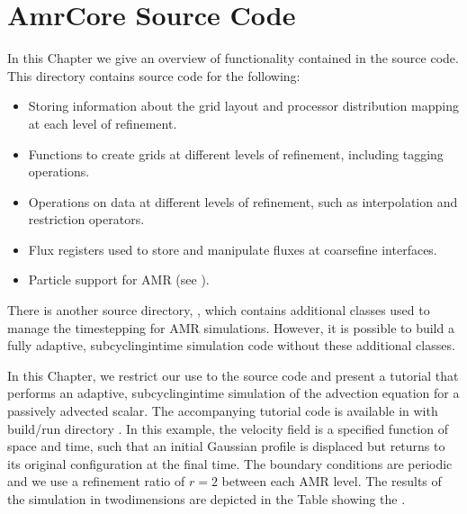 \documentclass[letterpaper,10pt,english]{sphinxmanual}
\begin{document}
\chapter{AmrCore Source Code}
\label{\detokenize{AmrCore_Chapter:amrcore-source-code}}\label{\detokenize{AmrCore_Chapter:chap-amrcore}}\label{\detokenize{AmrCore_Chapter::doc}}
\sphinxAtStartPar
In this Chapter we give an overview of functionality contained in the
 source code.  This directory contains source code for the
following:
\begin{itemize}
\item {} 
\sphinxAtStartPar
Storing information about the grid layout and processor distribution mapping
at each level of refinement.

\item {} 
\sphinxAtStartPar
Functions to create grids at different levels of refinement, including
tagging operations.

\item {} 
\sphinxAtStartPar
Operations on data at different levels of refinement, such as interpolation
and restriction operators.

\item {} 
\sphinxAtStartPar
Flux registers used to store and manipulate fluxes at coarse\sphinxhyphen{}fine
interfaces.

\item {} 
\sphinxAtStartPar
Particle support for AMR (see {\hyperref[\detokenize{Particle_Chapter:chap-particles}]{}}).

\end{itemize}

\sphinxAtStartPar
There is another source directory, , which contains
additional classes used to manage the time\sphinxhyphen{}stepping for AMR simulations.
However, it is possible to build a fully adaptive, subcycling\sphinxhyphen{}in\sphinxhyphen{}time
simulation code without these additional classes.

\sphinxAtStartPar
In this Chapter, we restrict our use to the  source code
and present a tutorial that performs an adaptive, subcycling\sphinxhyphen{}in\sphinxhyphen{}time simulation
of the advection equation for a passively advected scalar.  The accompanying
tutorial code is available in  with
build/run directory . In this example, the velocity field
is a specified function of space and time, such that an initial Gaussian
profile is displaced but returns to its original configuration at the final
time.  The boundary conditions are periodic and we use a refinement ratio of
\(r=2\) between each AMR level. The results of the simulation in
two\sphinxhyphen{}dimensions are depicted in the Table showing the {\hyperref[\detokenize{AmrCore:fig-adv}]{}}.
\end{document}

